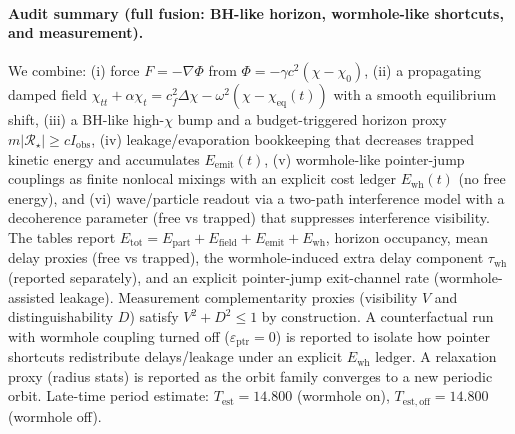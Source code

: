 \paragraph{Audit summary (full fusion: BH-like horizon, wormhole-like shortcuts, and measurement).} \AuditTag We combine: (i) force $F=-\nabla\Phi$ from $\Phi=-\gamma c^2(\chi-\chi_0)$, (ii) a propagating damped field $\chi_{tt}+\alpha\chi_t=c_f^2\Delta\chi-\omega^2(\chi-\chi_{\mathrm{eq}}(t))$ with a smooth equilibrium shift, (iii) a BH-like high-$\chi$ bump and a budget-triggered horizon proxy $m|\mathcal R_\star|\ge cI_{\mathrm{obs}}$, (iv) leakage/evaporation bookkeeping that decreases trapped kinetic energy and accumulates $E_{\mathrm{emit}}(t)$, (v) wormhole-like pointer-jump couplings as finite nonlocal mixings with an explicit cost ledger $E_{\mathrm{wh}}(t)$ (no free energy), and (vi) wave/particle readout via a two-path interference model with a decoherence parameter (free vs trapped) that suppresses interference visibility. The tables report $E_{\mathrm{tot}}=E_{\mathrm{part}}+E_{\mathrm{field}}+E_{\mathrm{emit}}+E_{\mathrm{wh}}$, horizon occupancy, mean delay proxies (free vs trapped), the wormhole-induced extra delay component $\tau_{\mathrm{wh}}$ (reported separately), and an explicit pointer-jump exit-channel rate (wormhole-assisted leakage). Measurement complementarity proxies (visibility $V$ and distinguishability $D$) satisfy $V^2+D^2\le 1$ by construction. A counterfactual run with wormhole coupling turned off ($\varepsilon_{\mathrm{ptr}}=0$) is reported to isolate how pointer shortcuts redistribute delays/leakage under an explicit $E_{\mathrm{wh}}$ ledger. A relaxation proxy (radius stats) is reported as the orbit family converges to a new periodic orbit. Late-time period estimate: $T_{\mathrm{est}}=14.800$ (wormhole on), $T_{\mathrm{est,off}}=14.800$ (wormhole off).